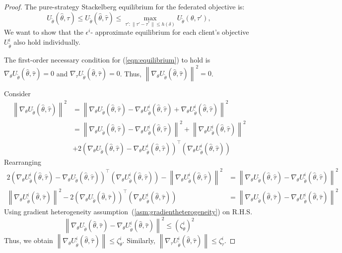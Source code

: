\documentclass{article}
\theoremstyle{definition}
\begin{document}
\begin{proof}
    The pure-strategy Stackelberg equilibrium for the federated objective is:
\begin{equation}
\label{eqn:equilibrium}
         U_{\tilde\theta}(\hat\theta,\tau)\leq U_{\tilde\theta}(\hat\theta,\hat\tau)\leq \max_{{\tau\prime : \|\tau\prime-\tau^*\|\leq h(\delta)}}U_{\tilde\theta}(\theta,\tau\prime),
     \end{equation}
We want to show that the $\epsilon^i$- approximate equilibrium for each client's objective $U_{\tilde{\theta}}^i $ also hold individually.

The first-order necessary condition for (\ref{eqn:equilibrium}) to hold is $\nabla_{\theta}U_{\tilde\theta}(\hat\theta,\hat\tau)=0$ and $\nabla_{\tau}U_{\tilde\theta}(\hat\theta,\hat\tau)=0$. Thus, $\left\|\nabla_{\theta}U_{\tilde\theta}(\hat\theta,\hat\tau)\right\|^2=0$.

Consider
\begin{align*}
\left\|\nabla_{\theta}U_{\tilde\theta}(\hat\theta,\hat\tau)\right\|^2&=
\left\|\nabla_{\theta}U_{\tilde\theta}(\hat\theta,\hat\tau)-\nabla_{\theta}U_{\tilde\theta}^i(\hat\theta,\hat\tau)+\nabla_{\theta}U_{\tilde\theta}^i(\hat\theta,\hat\tau)\right\|^2\\
&=\left\|\nabla_{\theta}U_{\tilde\theta}(\hat\theta,\hat\tau)-\nabla_{\theta}U_{\tilde\theta}^i(\hat\theta,\hat\tau)\right\|^2+\left\|\nabla_{\theta}U_{\tilde\theta}^i(\hat\theta,\hat\tau)\right\|^2\\
&+2\left(\nabla_{\theta}U_{\tilde\theta}(\hat\theta,\hat\tau)-\nabla_{\theta}U_{\tilde\theta}^i(\hat\theta,\hat\tau)\right)^\top\left(\nabla_{\theta}U_{\tilde\theta}^i(\hat\theta,\hat\tau)\right)
\end{align*}
Rearranging
\begin{align*}
 2\left(\nabla_{\theta}U_{\tilde\theta}^i(\hat\theta,\hat\tau)-\nabla_{\theta}U_{\tilde\theta}(\hat\theta,\hat\tau)\right)^\top\left(\nabla_{\theta}U_{\tilde\theta}^i(\hat\theta,\hat\tau)\right)-\left\|\nabla_{\theta}U_{\tilde\theta}^i(\hat\theta,\hat\tau)\right\|^2&= \left\|\nabla_{\theta}U_{\tilde\theta}(\hat\theta,\hat\tau)-\nabla_{\theta}U_{\tilde\theta}^i(\hat\theta,\hat\tau)\right\|^2\\
\left\|\nabla_{\theta}U_{\tilde\theta}^i(\hat\theta,\hat\tau)\right\|^2-2\left(\nabla_{\theta}U_{\tilde\theta}(\hat\theta,\hat\tau)\right)^\top\left(\nabla_{\theta}U_{\tilde\theta}^i(\hat\theta,\hat\tau)\right)&=  \left\|\nabla_{\theta}U_{\tilde\theta}(\hat\theta,\hat\tau)-\nabla_{\theta}U_{\tilde\theta}^i(\hat\theta,\hat\tau)\right\|^2
\end{align*}
Using gradient heterogeneity assumption~(\ref{asm:gradientheterogeneity}) on R.H.S.
\begin{equation*}
 \left\|\nabla_{\theta}U_{\tilde\theta}(\hat\theta,\hat\tau)-\nabla_{\theta}U_{\tilde\theta}^i(\hat\theta,\hat\tau)\right\|^2\leq (\zeta_{\theta}^i)^2
 \end{equation*}
Thus, we obtain $\left\|\nabla_{\theta}U_{\tilde\theta}^i(\hat\theta,\hat\tau)\right\| \leq \zeta_{\theta}^i.$ Similarly, $\left\|\nabla_{\tau}U_{\tilde\theta}^i(\hat\theta,\hat\tau)\right\| \leq \zeta_{\tau}^i$.


\end{proof}
\end{document}
